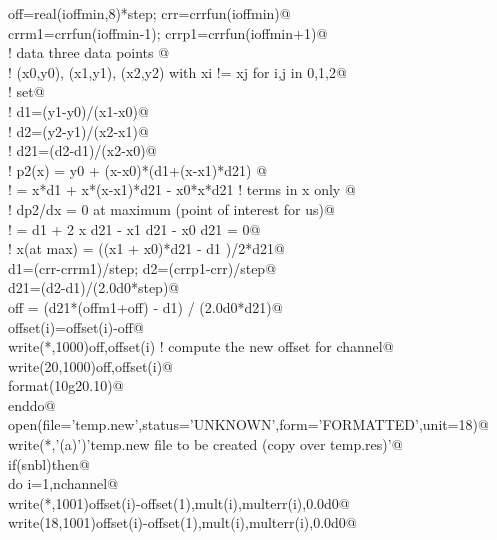 \documentclass[10pt,a4paper,notitlepage]{article}
\begin{document}
\begin{flushleft}
\begin{list}{}{}
\mbox{}\verb@       off=real(ioffmin,8)*step; crr=crrfun(ioffmin)@\\
\mbox{}\verb@       crrm1=crrfun(ioffmin-1); crrp1=crrfun(ioffmin+1)@\\
\mbox{}\verb@! data three data points @\\
\mbox{}\verb@! (x0,y0), (x1,y1), (x2,y2) with xi != xj for i,j in {0,1,2}@\\
\mbox{}\verb@! set@\\
\mbox{}\verb@! d1=(y1-y0)/(x1-x0)@\\
\mbox{}\verb@! d2=(y2-y1)/(x2-x1)@\\
\mbox{}\verb@! d21=(d2-d1)/(x2-x0)@\\
\mbox{}\verb@! p2(x)  =  y0 + (x-x0)*(d1+(x-x1)*d21) @\\
\mbox{}\verb@!        =  x*d1 + x*(x-x1)*d21 - x0*x*d21  ! terms in x only     @\\
\mbox{}\verb@! dp2/dx =  0 at maximum (point of interest for us)@\\
\mbox{}\verb@!        =  d1 + 2 x d21 - x1 d21 - x0 d21 = 0@\\
\mbox{}\verb@!      x(at max) = ((x1 + x0)*d21 - d1 )/2*d21@\\
\mbox{}\verb@       d1=(crr-crrm1)/step; d2=(crrp1-crr)/step@\\
\mbox{}\verb@       d21=(d2-d1)/(2.0d0*step)@\\
\mbox{}\verb@       off = (d21*(offm1+off) - d1) / (2.0d0*d21)@\\
\mbox{}\verb@       offset(i)=offset(i)-off@\\
\mbox{}\verb@       write(*,1000)off,offset(i)  ! compute the new offset for channel@\\
\mbox{}\verb@       write(20,1000)off,offset(i)@\\
\mbox{}   format(10g20.10)@\\
\mbox{}\verb@      enddo@\\
\mbox{}\verb@      open(file='temp.new',status='UNKNOWN',form='FORMATTED',unit=18)@\\
\mbox{}\verb@      write(*,'(a)')'temp.new file to be created (copy over temp.res)'@\\
\mbox{}\verb@       if(snbl)then@\\
\mbox{}\verb@        do i=1,nchannel@\\
\mbox{}\verb@          write(*,1001)offset(i)-offset(1),mult(i),multerr(i),0.0d0@\\
\mbox{}\verb@          write(18,1001)offset(i)-offset(1),mult(i),multerr(i),0.0d0@\\

\end{list}
\end{flushleft}
\end{document}
